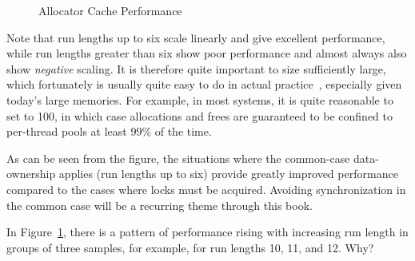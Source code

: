 \begin{figure}[htb]
\begin{center}
\end{center}
\caption{Allocator Cache Performance}
\label{fig:SMPdesign:Allocator Cache Performance}
\end{figure}

Note that run lengths up to six scale linearly and give excellent performance,
while run lengths greater than six show poor performance and almost always
also show \emph{negative} scaling.
It is therefore quite important to size 
sufficiently large,
which fortunately is usually quite easy to do in actual
practice~\cite{McKenney01e}, especially given today's large memories.
For example, in most systems, it is quite reasonable to set
 to 100, in which case allocations and frees
are guaranteed to be confined to per-thread pools at least 99\% of
the time.

As can be seen from the figure, the situations where the common-case
data-ownership applies (run lengths up to six) provide greatly improved
performance compared to the cases where locks must be acquired.
Avoiding synchronization in the common case will be a recurring theme through
this book.

\QuickQuiz{}
	In Figure~\ref{fig:SMPdesign:Allocator Cache Performance},
	there is a pattern of performance rising with increasing run
	length in groups of three samples, for example, for run lengths
	10, 11, and 12.
	Why?
 \QuickQuizEnd

